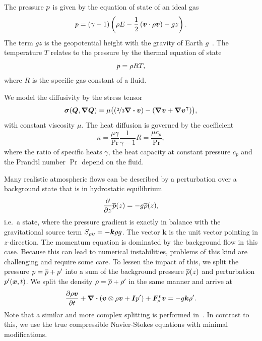 \documentclass[runningheads]{llncs}
\begin{document}
The pressure $p$ is given by the equation of state of an ideal gas
\begin{equation}
  \label{eq:eos}
  p = (\gamma - 1) \left(\rho E - \frac{1}{2} \left(\bm{v} \cdot \rho \bm{v} \right) - gz \right).
\end{equation}
The term $gz$ is the geopotential height with the gravity of Earth $g$~\cite{giraldo2008study}.
The temperature $T$ relates to the pressure by the thermal equation of state
\begin{equation}
  \label{eq:temperature}
  p = \rho R T,
\end{equation}
where $R$ is the specific gas constant of a fluid.

We model the diffusivity by the stress tensor
\begin{equation}
  \label{eq:stress-tensor}
  \stressT(\Q, \gradQ) =
  \mu
  \bigl(
  \left(\nicefrac{2}{3} \divergence{\Qv} \right) -
  \left( \gradient{\Qv} + \gradient{\Qv}^\intercal \right)
  \bigr),
\end{equation}
with constant viscosity $\mu$.
The heat diffusion is governed by the coefficient
\begin{equation}
  \label{eq:heat-conduction-coeff}
  \kappa = \frac{\mu \gamma}{\Pr} \frac{1}{\gamma - 1} R = \frac{\mu c_p}{\Pr},
\end{equation}
where the ratio of specific heats $\gamma$, the heat capacity at constant pressure $c_p$ and the Prandtl number $\Pr$ depend on the fluid.

Many realistic atmospheric flows can be described by a perturbation over a background state that is in hydrostatic equilibrium
\newcommand{\backgroundPressure}{\overline{\pressure}}
\newcommand{\backgroundRho}{\overline{\Qrho}}
\begin{equation}
  \label{eq:hydrostatic-balance}
  \pdv{}{z} \backgroundPressure{\left (z \right )} = -g \backgroundRho(z),
\end{equation}
i.e.\ a state, where the pressure gradient is exactly in balance with the gravitational source term $\source[\Qj] = - \bm{k} \Qrho g$.
The vector $\bm{k}$ is the unit vector pointing in $z$-direction.
The momentum equation is dominated by the background flow in this case.
Because this can lead to numerical instabilities, problems of this kind are challenging and require some care.
To lessen the impact of this, we split the pressure $\pressure = \backgroundPressure + \pressure'$ into a sum of the background pressure $\backgroundPressure(z)$ and perturbation $p'(\bm{x}, t)$.
We split the density $\Qrho = \backgroundRho + \Qrho'$ in the same manner and arrive at
\begin{equation}
  \label{eq:momentum-equation-split}
  \pdv{\Qj}{t}+ \divergence{ \left(
    \Qv \otimes \Qj + \bm{I} \pressure'
    \right)
  } + \viscFlux_\Qj
  =
  -g \bm{k} \Qrho'.
\end{equation}
Note that a similar and more complex splitting is performed in~\cite{muller2010adaptive,giraldo2008study}.
In contrast to this, we use the true compressible Navier-Stokes equations with minimal modifications.
\end{document}
